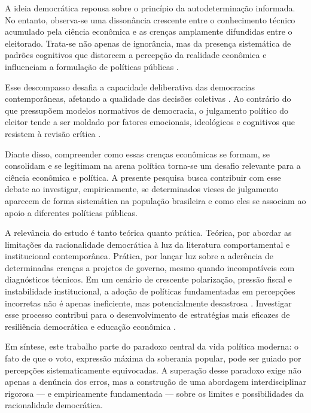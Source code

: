 
A ideia democrática repousa sobre o princípio da autodeterminação informada. No entanto, observa-se uma dissonância crescente entre o conhecimento técnico acumulado pela ciência econômica e as crenças amplamente difundidas entre o eleitorado. Trata-se não apenas de ignorância, mas da presença sistemática de padrões cognitivos que distorcem a percepção da realidade econômica e influenciam a formulação de políticas públicas \cite{The_Myth_of_the_Rational_Voter,Judgment_under_Uncertainty}.

Esse descompasso desafia a capacidade deliberativa das democracias contemporâneas, afetando a qualidade das decisões coletivas \cite{downs1957economic}. Ao contrário do que pressupõem modelos normativos de democracia, o julgamento político do eleitor tende a ser moldado por fatores emocionais, ideológicos e cognitivos que resistem à revisão crítica \cite{kahneman2011thinking,kahan2012polarization}.

Diante disso, compreender como essas crenças econômicas se formam, se consolidam e se legitimam na arena política torna-se um desafio relevante para a ciência econômica e política. A presente pesquisa busca contribuir com esse debate ao investigar, empiricamente, se determinados vieses de julgamento aparecem de forma sistemática na população brasileira e como eles se associam ao apoio a diferentes políticas públicas.

A relevância do estudo é tanto teórica quanto prática. Teórica, por abordar as limitações da racionalidade democrática à luz da literatura comportamental e institucional contemporânea. Prática, por lançar luz sobre a aderência de determinadas crenças a projetos de governo, mesmo quando incompatíveis com diagnósticos técnicos. Em um cenário de crescente polarização, pressão fiscal e instabilidade institucional, a adoção de políticas fundamentadas em percepções incorretas não é apenas ineficiente, mas potencialmente desastrosa \cite{schumpeter1976capitalism,taleb2014antifragile}. Investigar esse processo contribui para o desenvolvimento de estratégias mais eficazes de resiliência democrática e educação econômica \cite{franco2022cartas,zaller1992nature}.

Em síntese, este trabalho parte do paradoxo central da vida política moderna: o fato de que o voto, expressão máxima da soberania popular, pode ser guiado por percepções sistematicamente equivocadas. A superação desse paradoxo exige não apenas a denúncia dos erros, mas a construção de uma abordagem interdisciplinar rigorosa — e empiricamente fundamentada — sobre os limites e possibilidades da racionalidade democrática.


